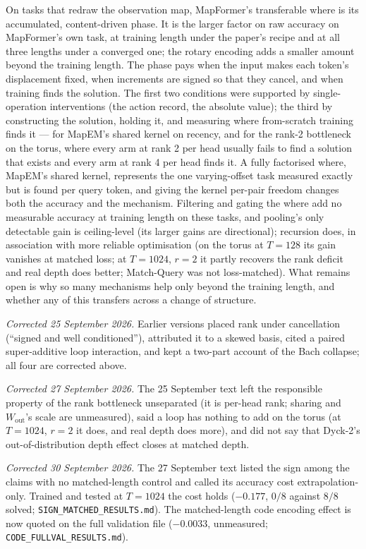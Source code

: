 \documentclass[10pt]{article}
\begin{document}
On tasks that redraw the observation map, MapFormer's transferable where is its accumulated, content-driven
phase. It is the larger factor on raw accuracy on MapFormer's own task, at training length under the paper's
recipe and at all three lengths under a converged one; the rotary encoding adds a smaller amount beyond the training length. The phase pays when the input makes each token's
displacement fixed, when increments are signed so that they cancel, and when training
finds the solution. The first two conditions were supported by single-operation interventions (the action
record, the absolute value); the third by constructing the solution, holding it, and measuring where
from-scratch training finds it --- for MapEM's shared kernel on recency, and for the rank-2 bottleneck on
the torus, where every arm at rank 2 per head usually fails to find a solution that exists and every arm
at rank 4 per head finds it. A fully factorised where, MapEM's shared kernel, represents the one
varying-offset task measured exactly but is found per query token, and giving the kernel per-pair freedom
changes both the accuracy and the mechanism. Filtering and gating the where add no measurable
accuracy at training length on these tasks, and pooling's only detectable gain is ceiling-level (its larger gains are directional); recursion does, in
association with more reliable optimisation (on the torus at $T=128$ its gain vanishes at matched loss; at
$T=1024$, $r=2$ it partly recovers the rank deficit and real depth does better; Match-Query was not
loss-matched). What remains
open is why so many mechanisms help only beyond the training length, and whether any of this transfers across
a change of structure.

\emph{Corrected 25 September 2026.} Earlier versions placed rank under cancellation (``signed and well
conditioned''), attributed it to a skewed basis, cited a paired super-additive loop interaction, and kept a
two-part account of the Bach collapse; all four are corrected above.

\emph{Corrected 27 September 2026.} The 25 September text left the responsible property of the rank
bottleneck unseparated (it is per-head rank; sharing and $W_{\mathrm{out}}$'s scale are unmeasured), said a
loop has nothing to add on the torus (at $T=1024$, $r=2$ it does, and real depth does more), and did not say
that Dyck-2's out-of-distribution depth effect closes at matched depth.

\emph{Corrected 30 September 2026.} The 27 September text listed the sign among the claims with no
matched-length control and called its accuracy cost extrapolation-only. Trained and tested at $T=1024$ the cost
holds ($-0.177$, $0/8$ against $8/8$ solved; \texttt{SIGN\_MATCHED\_RESULTS.md}). The matched-length code encoding
effect is now quoted on the full validation file ($-0.0033$, unmeasured; \texttt{CODE\_FULLVAL\_RESULTS.md}).
\end{document}

